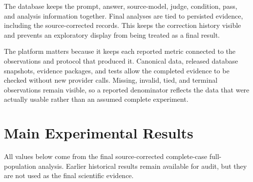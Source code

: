 \documentclass[11pt,a4paper]{article}
\begin{document}
The database keeps the prompt, answer, source-model, judge, condition, pass, and analysis information together. Final analyses are tied to persisted evidence, including the source-corrected records. This keeps the correction history visible and prevents an exploratory display from being treated as a final result.

The platform matters because it keeps each reported metric connected to the observations and protocol that produced it. Canonical data, released database snapshots, evidence packages, and tests allow the completed evidence to be checked without new provider calls. Missing, invalid, tied, and terminal observations remain visible, so a reported denominator reflects the data that were actually usable rather than an assumed complete experiment.

\section{Main Experimental Results}

All values below come from the final source-corrected complete-case full-population analysis. Earlier historical results remain available for audit, but they are not used as the final scientific evidence.
\end{document}
